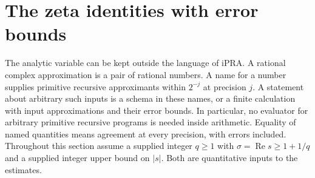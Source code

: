 \section{The zeta identities with error bounds}\label{sec:analytic}

The analytic variable can be kept outside the language of iPRA. A rational
complex approximation is a pair of rational numbers. A name for a number
supplies primitive recursive approximants within $2^{-j}$ at precision $j$.
A statement about arbitrary such inputs is a schema in these names, or a
finite calculation with input approximations and their error bounds. In
particular, no evaluator for arbitrary primitive recursive programs is
needed inside arithmetic. Equality of named quantities means agreement at
every precision, with errors included. Throughout this section assume a
supplied integer $q\ge1$ with $\sigma=\operatorname{Re}s\ge1+1/q$
and a supplied integer upper bound on $|s|$. Both are quantitative
inputs to the estimates.

